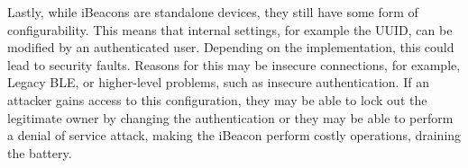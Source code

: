 Lastly, while iBeacons are standalone devices, they still have some form of configurability. This means that internal settings, for example the UUID, can be modified by an authenticated user. Depending on the implementation, this could lead to security faults. Reasons for this may be insecure connections, for example, Legacy \ac{BLE}, or higher-level problems, such as insecure authentication. If an attacker gains access to this configuration, they may be able to lock out the legitimate owner by changing the authentication or they may be able to perform a denial of service attack, making the iBeacon perform costly operations, draining the battery.
